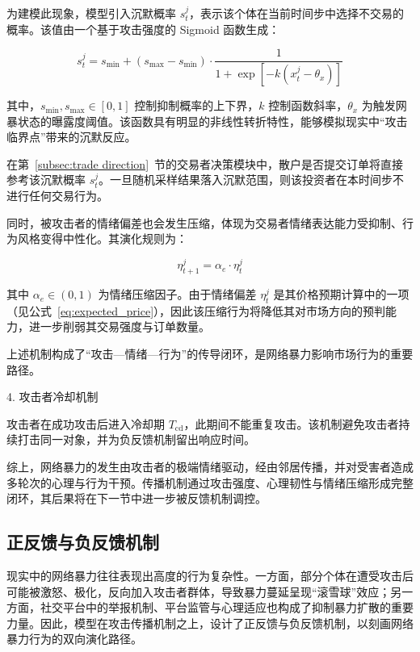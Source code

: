 为建模此现象，模型引入沉默概率 \( s_t^j \)，表示该个体在当前时间步中选择不交易的概率。该值由一个基于攻击强度的 Sigmoid 函数生成：

\begin{equation}
s_t^j = s_{\min} + (s_{\max} - s_{\min}) \cdot \frac{1}{1 + \exp[-k(x_t^j - \theta_x)]}
\label{eq:suppression}
\end{equation}

其中，\( s_{\min}, s_{\max} \in [0, 1] \) 控制抑制概率的上下界，\( k \) 控制函数斜率，\( \theta_x \) 为触发网暴状态的曝露度阈值。该函数具有明显的非线性转折特性，能够模拟现实中“攻击临界点”带来的沉默反应。

在第~\ref{subsec:trade direction}~节的交易者决策模块中，散户是否提交订单将直接参考该沉默概率 \( s_t^j \)。一旦随机采样结果落入沉默范围，则该投资者在本时间步不进行任何交易行为。

同时，被攻击者的情绪偏差也会发生压缩，体现为交易者情绪表达能力受抑制、行为风格变得中性化。其演化规则为：

\begin{equation}
\eta_{t+1}^j = \alpha_e \cdot \eta_t^j
\label{eq:emotion_decay}
\end{equation}

其中 \( \alpha_e \in (0,1) \) 为情绪压缩因子。由于情绪偏差 \( \eta_t^j \) 是其价格预期计算中的一项（见公式~\ref{eq:expected_price}），因此该压缩行为将降低其对市场方向的预判能力，进一步削弱其交易强度与订单数量。

上述机制构成了“攻击—情绪—行为”的传导闭环，是网络暴力影响市场行为的重要路径。

4. 攻击者冷却机制

攻击者在成功攻击后进入冷却期 \( T_{\text{cd}} \)，此期间不能重复攻击。该机制避免攻击者持续打击同一对象，并为负反馈机制留出响应时间。

综上，网络暴力的发生由攻击者的极端情绪驱动，经由邻居传播，并对受害者造成多轮次的心理与行为干预。传播机制通过攻击强度、心理韧性与情绪压缩形成完整闭环，其后果将在下一节中进一步被反馈机制调控。





\subsection{正反馈与负反馈机制}
\label{subsec:feedback_mechanisms}

现实中的网络暴力往往表现出高度的行为复杂性。一方面，部分个体在遭受攻击后可能被激怒、极化，反向加入攻击者群体，导致暴力蔓延呈现“滚雪球”效应；另一方面，社交平台中的举报机制、平台监管与心理适应也构成了抑制暴力扩散的重要力量。因此，模型在攻击传播机制之上，设计了正反馈与负反馈机制，以刻画网络暴力行为的双向演化路径。

